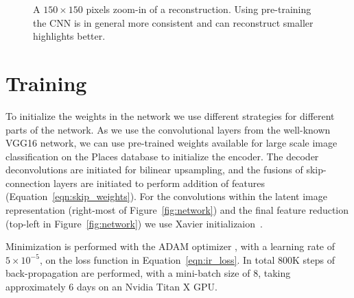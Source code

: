 \documentclass[acmtog]{acmart}
\newcommand{\figref}[1]{Figure~\ref{fig:#1}}
\newcommand{\eqnref}[1]{Equation~\ref{eqn:#1}}
\newcommand\belowfigspace{-2pt}
\begin{document}
\begin{figure}[t]
	\newcommand\ww{0.116}
	\centering
	\vspace{-10pt}
	\caption{\label{fig:init} A $150\times 150$ pixels zoom-in of a reconstruction. Using pre-training the CNN is in general more consistent and can reconstruct smaller highlights better.}
	\vspace{\belowfigspace}
\end{figure}

\section{Training}\label{sec:training}
To initialize the weights in the network we use different strategies for different parts of the network.
As we use the convolutional layers from the well-known VGG16 network, we can use pre-trained weights available for large scale image classification on the Places database \cite{Zhou2014} to initialize the encoder. The decoder deconvolutions are initiated for bilinear upsampling, and the fusions of skip-connection layers are initiated to perform addition of features (\eqnref{skip_weights}). For the convolutions within the latent image representation (right-most of \figref{network}) and the final feature reduction (top-left in \figref{network}) we use Xavier initializaion~\cite{Glorot2010}.

Minimization is performed with the ADAM optimizer \cite{Kingma2014}, with a learning rate of $5 \times 10^{-5}$, on the loss function in \eqnref{ir_loss}. In total $800$K steps of back-propagation are performed, with a mini-batch size of 8, taking approximately 6 days on an Nvidia Titan X GPU.
\end{document}
